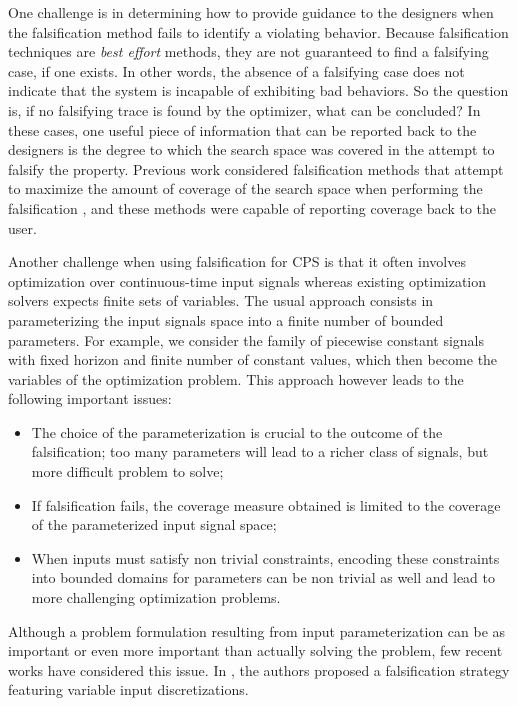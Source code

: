 One challenge is in determining how to provide guidance to
the designers when the falsification method fails to identify a
violating behavior.  Because falsification techniques are \emph{best
  effort} methods, they are not guaranteed to find a falsifying case,
if one exists.  In other words, the absence of a falsifying case does
not indicate that the system is incapable of exhibiting bad behaviors.
So the question is, if no falsifying trace is found by the optimizer,
what can be concluded? In these cases, one useful piece of information
that can be reported back to the designers is the degree to which the
search space was covered in the attempt to falsify the property.
Previous work considered falsification methods that attempt to
maximize the amount of coverage of the search space when performing
the falsification \cite{Dreossi2015,CAV2017}, and these methods were
capable of reporting coverage back to the user.

Another challenge when using falsification for CPS is that it often
involves optimization over continuous-time input signals whereas
existing optimization solvers expects finite sets of variables. The usual approach
consists in parameterizing the input signals space into a finite number
of bounded parameters. For example, we consider the family of
piecewise constant signals with fixed horizon and finite number of
constant values, which then become the variables of the optimization
problem.  This approach however leads to the following important issues:
\begin{itemize}
\item The choice of the parameterization is crucial to the outcome of
  the falsification; too many parameters will lead to a richer class
  of signals, but more difficult problem to solve;
\item If falsification fails, the coverage measure obtained
  is limited to the coverage of the parameterized input signal space;
\item When inputs must satisfy non trivial constraints, encoding
  these constraints into bounded domains for parameters can be non
  trivial as well and lead to more challenging optimization problems.
\end{itemize}
Although a problem formulation resulting from input parameterization
can be as important or even more important than actually solving the
problem, few recent works have considered this issue. In
\cite{DBLP:conf/atva/DeshmukhJKM15}, the authors proposed a
falsification strategy featuring variable input discretizations.

